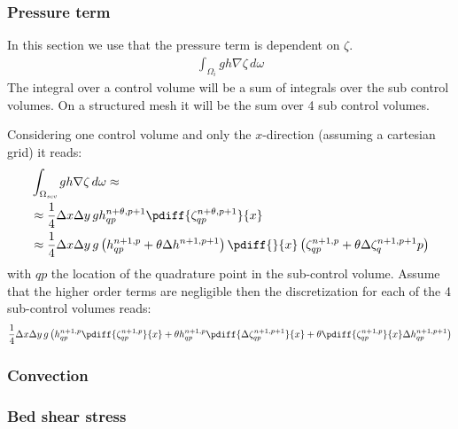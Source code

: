 \subsubsection{Pressure term} \label{sec:linearized_pressure_zeta}
In this section we use that the pressure term is dependent on $\zeta$.
\begin{align}
    \int_{\Omega_i} gh \nabla \zeta \, d\omega
\end{align}
The integral over a control volume will be a sum of integrals over the sub control volumes.
On a structured mesh it will be the sum over 4 sub control volumes.

Considering one control volume and only the $x$-direction (assuming a cartesian grid) it reads:
\begin{align}
    & \int_{\Omega_{\textit{scv}}} gh \nabla \zeta \, d\omega  \approx
    \\
    & \approx \quart \Dx\Dy\, g h^{n+\theta,p+1}_{qp} \pdiff{\zeta^{n+\theta,p+1}_{qp}}{x}
    \\
   & \approx \quart  \Dx\Dy\, g \left( h^{n+1,p}_{qp} + \theta \Delta h^{n+1,p+1}\right)  \pdiff{}{x}\left(\zeta^{n+1,p}_{qp} + \theta \Delta \zeta^{n+1,p+1}_qp\right)
\end{align}
with $qp$ the location of the quadrature point in the sub-control volume.
Assume that the higher order terms are negligible then the discretization for each of the 4 sub-control volumes reads:
\begin{align}
        \quart  \Dx\Dy\, g \left(
        h^{n+1,p}_{qp} \pdiff{\zeta^{n+1, p}_{qp}}{x}
        + \theta h^{n+1, p}_{qp} \pdiff{\Delta \zeta^{n+1, p+1}_{qp}}{x}
        + \theta \pdiff{\zeta^{n+1, p}_{qp}}{x} \Delta h^{n+1,p+1}_{qp}
          \right)
\end{align}

\subsubsection{Convection}
\notyet

\subsubsection{Bed shear stress}
\notyet

